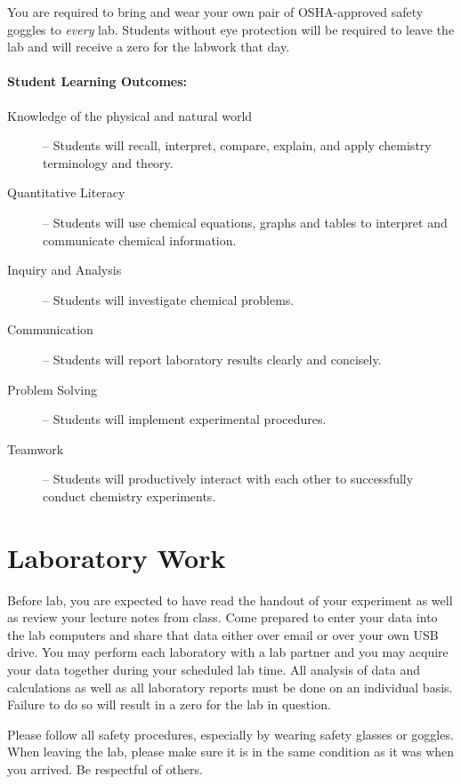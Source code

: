 \documentclass[12pt, letterpaper]{article}
\begin{document}
\noindent You are required to bring and wear your own pair of OSHA-approved safety goggles to \emph{every} lab. Students without eye protection will be required to leave the lab and will receive a zero for the labwork that day.

\paragraph{Student Learning Outcomes:}
\begin{description}
	\item[Knowledge of the physical and natural world] -- Students will recall, interpret, compare, explain, and apply chemistry terminology and theory.
	\item[Quantitative Literacy] -- Students will use chemical equations, graphs and tables to interpret and communicate chemical information.
	\item[Inquiry and Analysis] -- Students will investigate chemical problems.
	\item[Communication] -- Students will report laboratory results clearly and concisely.
	\item[Problem Solving] -- Students will implement experimental procedures.
	\item[Teamwork] -- Students will productively interact with each other to successfully conduct chemistry experiments.
\end{description}

\section*{Laboratory Work}
Before lab, you are expected to have read the handout of your experiment as well as review your lecture notes from class. Come prepared to enter your data into the lab computers and share that data either over email or over your own USB drive. You may perform each laboratory with a lab partner and you may acquire your data together during your scheduled lab time. All analysis of data and calculations as well as all laboratory reports must be done on an individual basis. Failure to do so will result in a zero for the lab in question.

\noindent Please follow all safety procedures, especially by wearing safety glasses or goggles. When leaving the lab, please make sure it is in the same condition as it was when you arrived. Be respectful of others.
\end{document}
